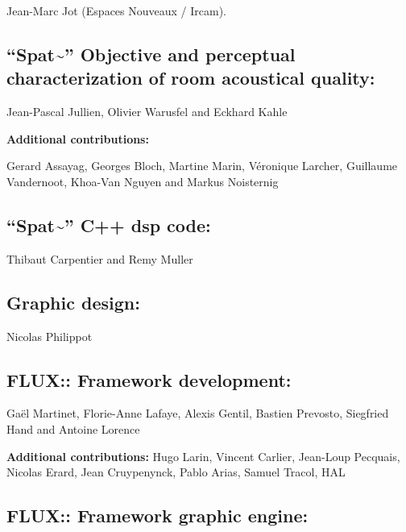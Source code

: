 \documentclass[
  letterpaper,
  DIV=11,
  numbers=noendperiod]{scrreport}
\begin{document}
Jean-Marc Jot (Espaces Nouveaux / Ircam).

\hypertarget{spat-objective-and-perceptual-characterization-of-room-acoustical-quality}{%
\subsection{\texorpdfstring{``Spat\textasciitilde{}'' Objective and
perceptual characterization of room acoustical
quality:}{``Spat\textasciitilde'' Objective and perceptual characterization of room acoustical quality:}}\label{spat-objective-and-perceptual-characterization-of-room-acoustical-quality}}

Jean-Pascal Jullien, Olivier Warusfel and Eckhard Kahle

\textbf{Additional contributions:}

Gerard Assayag, Georges Bloch, Martine Marin, Véronique Larcher,
Guillaume Vandernoot, Khoa-Van Nguyen and Markus Noisternig

\hypertarget{spat-c-dsp-code}{%
\subsection{\texorpdfstring{``Spat\textasciitilde{}'' C++ dsp
code:}{``Spat\textasciitilde'' C++ dsp code:}}\label{spat-c-dsp-code}}

Thibaut Carpentier and Remy Muller

\hypertarget{graphic-design}{%
\subsection{Graphic design:}\label{graphic-design}}

Nicolas Philippot

\hypertarget{flux-framework-development}{%
\subsection{FLUX:: Framework
development:}\label{flux-framework-development}}

Gaël Martinet, Florie-Anne Lafaye, Alexis Gentil, Bastien Prevosto,
Siegfried Hand and Antoine Lorence

\textbf{Additional contributions:} Hugo Larin, Vincent Carlier,
Jean-Loup Pecquais, Nicolas Erard, Jean Cruypenynck, Pablo Arias, Samuel
Tracol, HAL

\hypertarget{flux-framework-graphic-engine}{%
\subsection{FLUX:: Framework graphic
engine:}\label{flux-framework-graphic-engine}}
\end{document}
